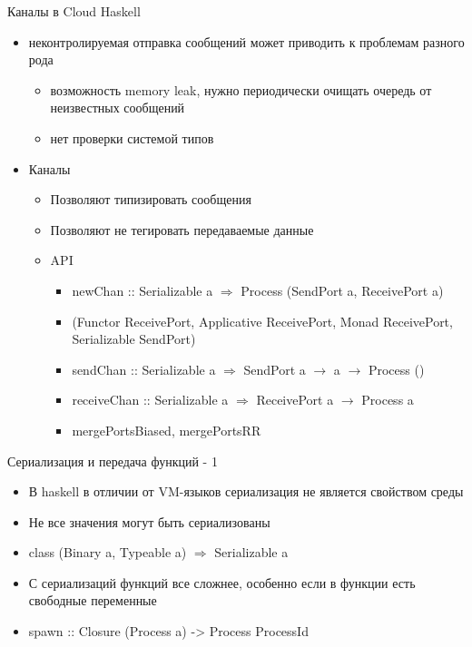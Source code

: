 \documentclass{beamer}
\begin{document}
\begin{frame}{Каналы в Cloud Haskell}
  \begin{itemize}
    \item неконтролируемая отправка сообщений может приводить к проблемам разного рода
    \begin{itemize}
      \item возможность memory leak, нужно периодически очищать очередь от неизвестных сообщений
      \item нет проверки системой типов
    \end{itemize}
    \item Каналы
      \begin{itemize}
        \item Позволяют типизировать сообщения
        \item Позволяют не тегировать передаваемые данные
        \item API
    \begin{itemize}
      \item newChan :: Serializable a $\Rightarrow$ Process (SendPort a, ReceivePort a)
      \item (Functor ReceivePort, Applicative ReceivePort, Monad ReceivePort, Serializable SendPort)
      \item sendChan :: Serializable a $\Rightarrow$ SendPort a $\rightarrow$ a $\rightarrow$ Process ()
      \item receiveChan :: Serializable a $\Rightarrow$ ReceivePort a $\rightarrow$ Process a
      \item mergePortsBiased, mergePortsRR
    \end{itemize}
  \end{itemize}
  \end{itemize}
\end{frame}

\begin{frame}{Сериализация и передача функций - 1}
  \begin{itemize}
    \item В haskell в отличии от VM-языков сериализация не является свойством среды
    \item Не все значения могут быть сериализованы
    \item class (Binary a, Typeable a) $\Rightarrow$ Serializable a
    \item С сериализаций функций все сложнее, особенно если в функции есть свободные переменные
    \item spawn :: Closure (Process a) -> Process ProcessId
  \end{itemize}
\end{frame}
\end{document}
